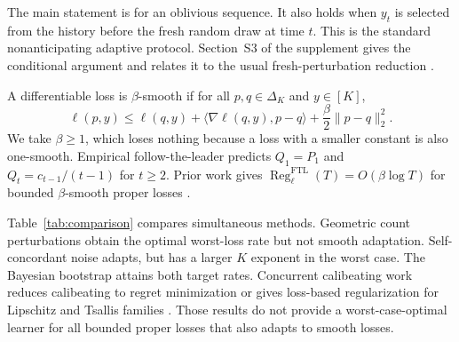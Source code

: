 \documentclass[twoside]{article}
\newcommand{\Reg}{\operatorname{Reg}}
\begin{document}
The main statement is for an oblivious sequence. It also holds when $y_t$ is selected from the history before the fresh random draw at time $t$. This is the standard nonanticipating adaptive protocol. Section~S3 of the supplement gives the conditional argument and relates it to the usual fresh-perturbation reduction \citep{hutter2005}.

A differentiable loss is $\beta$-smooth if for all $p,q\in\Delta_K$ and $y\in[K]$, \[ \ell(p,y)\leq \ell(q,y)+\langle\nabla\ell(q,y),p-q\rangle+\frac\beta2\|p-q\|_2^2. \] We take $\beta\geq1$, which loses nothing because a loss with a smaller constant is also one-smooth. Empirical follow-the-leader predicts $Q_1=P_1$ and $Q_t=c_{t-1}/(t-1)$ for $t\geq2$. Prior work gives $\Reg_\ell^{\mathrm{FTL}}(T)=O(\beta\log T)$ for bounded $\beta$-smooth proper losses \citep{luo2024,frongillo2026}.

Table~\ref{tab:comparison} compares simultaneous methods. Geometric count perturbations obtain the optimal worst-loss rate but not smooth adaptation. Self-concordant noise adapts, but has a larger $K$ exponent in the worst case. The Bayesian bootstrap attains both target rates. Concurrent calibeating work reduces calibeating to regret minimization \citep{chen2026} or gives loss-based regularization for Lipschitz and Tsallis families \citep{fichtl2026}. Those results do not provide a worst-case-optimal learner for all bounded proper losses that also adapts to smooth losses.

\begin{table}[t]
\caption{Per-loss expected regret for one loss-agnostic multiclass forecaster. Logarithmic entries concern bounded $\beta$-smooth proper losses. The count-adaptive bound implies the stated worst-case rate.}
\label{tab:comparison}
\centering
\small
{}
\end{table}
\end{document}
